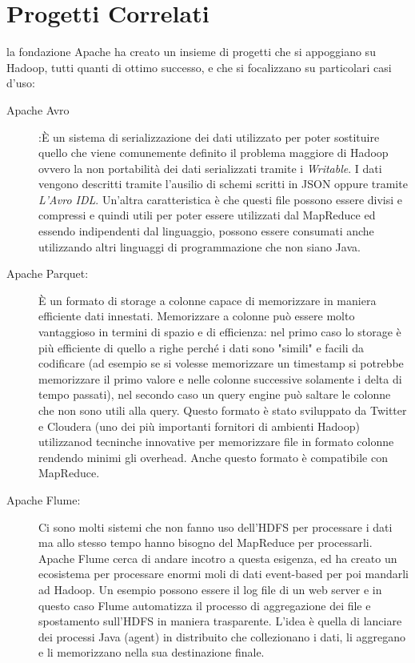 \section{Progetti Correlati}
la fondazione Apache ha creato un insieme di progetti che si appoggiano su Hadoop, tutti quanti di ottimo successo, e che si focalizzano su particolari casi d'uso:
\begin{description}
  \item[Apache Avro]:È un sistema di serializzazione dei dati utilizzato per poter sostituire quello che viene comunemente definito il problema maggiore di Hadoop ovvero la non portabilità dei dati serializzati tramite i \textit{Writable}. I dati vengono descritti tramite l'ausilio di schemi scritti in JSON oppure tramite \textit{L'Avro IDL}. Un'altra caratteristica è che questi file possono essere divisi e compressi e quindi utili per poter essere utilizzati dal MapReduce ed essendo indipendenti dal linguaggio, possono essere consumati anche utilizzando altri linguaggi di programmazione che non siano Java.
  \item[Apache Parquet:] È un formato di storage a colonne capace di memorizzare in maniera efficiente dati innestati. Memorizzare a colonne può essere molto vantaggioso in termini di spazio e di efficienza: nel primo caso lo storage è più efficiente di quello a righe perché i dati sono "simili" e facili da codificare (ad esempio se si volesse memorizzare un timestamp si potrebbe memorizzare il primo valore e nelle colonne successive solamente i delta di tempo passati), nel secondo caso un query engine può saltare le colonne che non sono utili alla query. Questo formato è stato sviluppato da Twitter e Cloudera (uno dei più importanti fornitori di ambienti Hadoop) utilizzanod tecninche innovative per memorizzare file in formato colonne rendendo minimi gli overhead. Anche questo formato è compatibile con MapReduce.
  \item[Apache Flume:] Ci sono molti sistemi che non fanno uso dell'HDFS per processare i dati ma allo stesso tempo hanno bisogno del MapReduce per processarli. Apache Flume cerca di andare incotro a questa esigenza, ed ha creato un ecosistema per processare enormi moli di dati event-based per poi mandarli ad Hadoop. Un esempio possono essere il log file di un web server e in questo caso Flume automatizza il processo di aggregazione dei file e spostamento sull'HDFS in maniera trasparente. L'idea è quella di lanciare dei processi Java (agent) in distribuito che collezionano i dati, li aggregano e li memorizzano nella sua destinazione finale.

\end{description}
